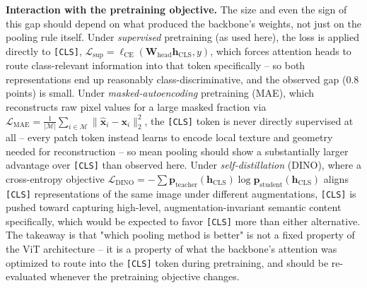 \textbf{Interaction with the pretraining objective.} The size and even the
sign of this gap should depend on what produced the backbone's weights, not
just on the pooling rule itself. Under \emph{supervised} pretraining (as
used here), the loss is applied directly to \texttt{[CLS]},
$\mathcal{L}_{\text{sup}}=\ell_{\text{CE}}(\mathbf{W}_{\text{head}}\mathbf{h}_{\text{CLS}},y)$,
which forces attention heads to route class-relevant information into that
token specifically -- so both representations end up reasonably
class-discriminative, and the observed gap ($0.8$ points) is small. Under
\emph{masked-autoencoding} pretraining (MAE), which reconstructs raw pixel
values for a large masked fraction via
$\mathcal{L}_{\text{MAE}}=\frac{1}{|\mathcal{M}|}\sum_{i\in\mathcal{M}}\|\hat{\mathbf{x}}_i-\mathbf{x}_i\|_2^2$,
the \texttt{[CLS]} token is never directly supervised at all -- every
patch token instead learns to encode local texture and geometry needed for
reconstruction -- so mean pooling should show a substantially larger
advantage over \texttt{[CLS]} than observed here. Under
\emph{self-distillation} (DINO), where a cross-entropy objective
$\mathcal{L}_{\text{DINO}}=-\sum\mathbf{p}_{\text{teacher}}(\mathbf{h}_{\text{CLS}})\log\mathbf{p}_{\text{student}}(\mathbf{h}_{\text{CLS}})$
aligns \texttt{[CLS]} representations of the same image under different
augmentations, \texttt{[CLS]} is pushed toward capturing high-level,
augmentation-invariant semantic content specifically, which would be
expected to favor \texttt{[CLS]} more than either alternative. The
takeaway is that "which pooling method is better" is not a fixed property
of the ViT architecture -- it is a property of what the backbone's
attention was optimized to route into the \texttt{[CLS]} token during
pretraining, and should be re-evaluated whenever the pretraining objective
changes.
